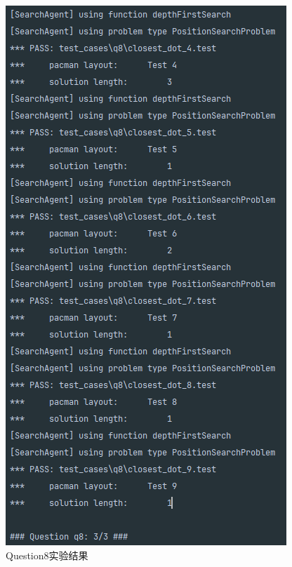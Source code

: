 \begin{figure}[!htbp]
\begin{minipage}[t]{0.4\textwidth}
    \end{minipage}
    \begin{minipage}[t]{0.4\textwidth}
    \centering
    \includegraphics[width=\textwidth]{pic/q82.png}
    \end{minipage}
    \caption{Question8实验结果}\label{q8}
\end{figure}
%
%
%
%
